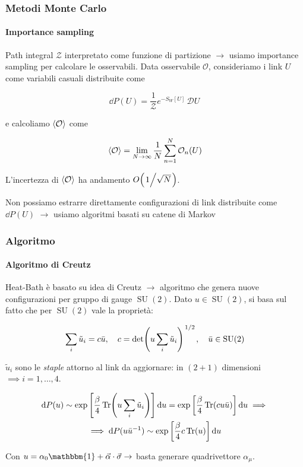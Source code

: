 \documentclass{beamer}
\newcommand{\D}[1]{\,\mathcal{D}#1\,}
\newcommand{\Z}{\mathcal{Z}}
\newcommand{\SU}{\operatorname{SU}}
\newcommand{\id}{\mathbbm{1}}
\begin{document}
\begin{frame}
	\frametitle{Metodi Monte Carlo}
	\framesubtitle{Importance sampling}

	Path integral $\Z$ interpretato come funzione di partizione $\rightarrow$ usiamo \alert{importance sampling}
	per calcolare le osservabili. Data osservabile $\mathcal{O}$, consideriamo i link $U$ come variabili casuali distribuite come

	\begin{equation*}
		\dd{P(U)} = \frac{1}{\Z} e^{-S_W[U]} \D U
	\end{equation*}

	e calcoliamo $\expval{\mathcal{O}}$ come 

	\begin{equation*}
		\expval{\mathcal{O}} = \lim_{N \rightarrow \infty} \frac{1}{N} \sum_{n=1}^N \mathcal{O}_n(U)
	\end{equation*}

	L'incertezza di $\expval{\mathcal{O}}$ ha andamento $O\qty(\flatfrac{1}{\sqrt{N}})$. 
	
	Non possiamo estrarre direttamente
	configurazioni di link distribuite come $\dd{P(U)}$ $\rightarrow$ usiamo algoritmi basati su \alert{catene di Markov}

\end{frame}

\begin{frame}
	\frametitle{Algoritmo}
	\framesubtitle{Algoritmo di Creutz}

	Heat-Bath è basato su \alert{idea di Creutz} $\rightarrow$ algoritmo che genera nuove configurazioni per gruppo di gauge
	$\SU(2)$. Dato $u \in \SU(2)$, si basa sul fatto che per $\SU(2)$ vale la proprietà:

	\begin{equation*}
		\sum_i \tilde{u}_i = c \bar{u} \qc c = \det(u \sum_i \tilde{u}_i)^{\flatfrac{1}{2}} \qc \bar{u} \in \SU(2) 
	\end{equation*}

	$\tilde{u}_i$ sono le \textit{staple} attorno al link da aggiornare: in $(2+1)$ dimensioni $\implies i = 1,\dots,4$.

	\begin{equation*}
		\begin{gathered}
			\dd{P(u)} \sim \exp\qty[\frac{\beta}{4} \Tr(u \sum_i \tilde{u}_i)] \dd{u}
				= \exp\qty[\frac{\beta}{4}\Tr(c u \bar{u})] \dd{u} \implies \\
			\implies \dd{P(u \bar{u}^{-1})} \sim \exp\qty[\frac{\beta}{4} c \Tr(u)] \dd{u}
		\end{gathered}
	\end{equation*}

	Con $u = \alpha_0 \id + \va{\alpha} \cdot \va{\sigma} \rightarrow$ basta \alert{generare quadrivettore $\alpha_\mu$}.

\end{frame}
\end{document}
